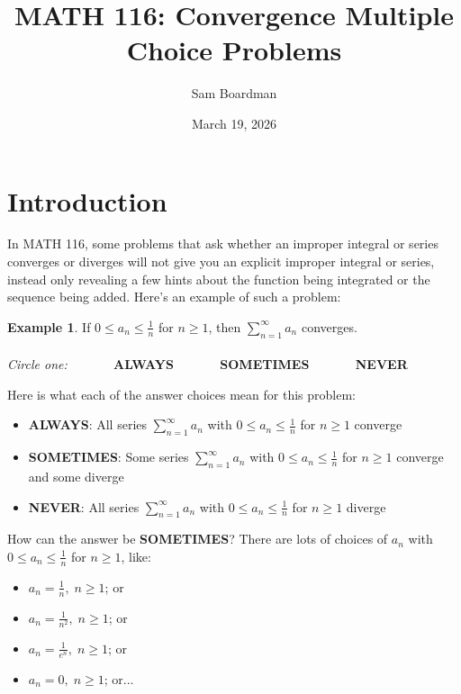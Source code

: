 \documentclass{article}
\title{MATH 116: Convergence Multiple Choice Problems}
\author{Sam Boardman}
\date{March 19, 2026}
\theoremstyle{definition} %
\newtheorem{example}{Example} %
\begin{document}
\maketitle

\section{Introduction}

In MATH 116, some problems that ask whether an improper integral or series converges or diverges will not give you an explicit improper integral or series, instead only revealing a few hints about the function being integrated or the sequence being added. Here's an example of such a problem: 

\begin{example}\label{first_example}
    If $0 \leq a_n \leq \frac{1}{n}$ for $n \geq 1$, then $\displaystyle\sum_{n=1}^\infty a_n$ converges. \\\\ 
    \textit{Circle one:} $\quad\quad\quad$ \textbf{ALWAYS} $\quad\quad\quad$ \textbf{SOMETIMES} $\quad\quad\quad$ \textbf{NEVER}
\end{example}

\vspace{20pt}

Here is what each of the answer choices mean for this problem:

\begin{itemize}
    \item \textbf{ALWAYS}: All series $\displaystyle\sum_{n=1}^\infty a_n$ with $0 \leq a_n \leq \frac{1}{n}$ for $n \geq 1$ converge
    \item \textbf{SOMETIMES}: Some series $\displaystyle\sum_{n=1}^\infty a_n$ with $0 \leq a_n \leq \frac{1}{n}$ for $n \geq 1$ converge and some diverge
    \item \textbf{NEVER}: All series $\displaystyle\sum_{n=1}^\infty a_n$ with $0 \leq a_n \leq \frac{1}{n}$ for $n \geq 1$ diverge
\end{itemize}

How can the answer be \textbf{SOMETIMES}? There are lots of choices of $a_n$ with $0 \leq a_n \leq \frac{1}{n}$ for $n \geq 1$, like:

\begin{itemize}
    \item $a_n = \frac{1}{n}, \; n \geq 1$; or
    \item $a_n = \frac{1}{n^2}, \; n \geq 1$; or 
    \item $a_n = \frac{1}{e^n}, \; n \geq 1$; or
    \item $a_n = 0, \; n \geq 1$; or...
\end{itemize}
\end{document}

